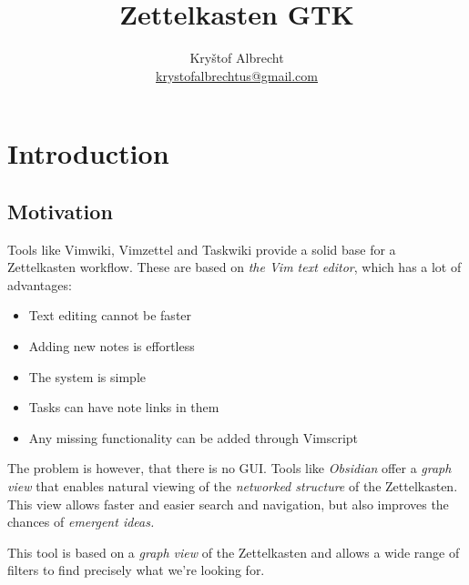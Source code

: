 \documentclass{article}
\title{Zettelkasten GTK}
\author{Kryštof Albrecht \\ \href{mailto:krystofalbrechtus@gmail.com}{krystofalbrechtus@gmail.com}}
\begin{document}
\maketitle
\tableofcontents

\newpage

\section{Introduction}

\subsection{Motivation}

Tools like Vimwiki, Vimzettel and Taskwiki provide a solid base for a Zettelkasten workflow. These are based on \emph{the Vim text editor}, which has a lot of advantages:

\begin{itemize}
	\item Text editing cannot be faster
	
	\item Adding new notes is effortless

	\item The system is simple

	\item Tasks can have note links in them

	\item Any missing functionality can be added through Vimscript
\end{itemize}

The problem is however, that there is no GUI. Tools like \emph{Obsidian} offer a \emph{graph view} that enables natural viewing of the \emph{networked structure} of the Zettelkasten. This view allows faster and easier search and navigation, but also improves the chances of \emph{emergent ideas.}

This tool is based on a \emph{graph view} of the Zettelkasten and allows a wide range of filters to find precisely what we're looking for.
\end{document}
